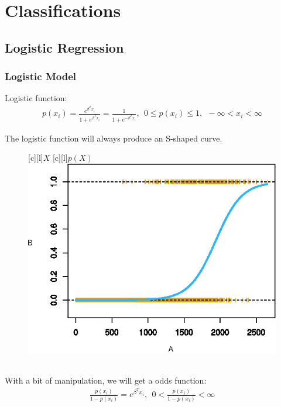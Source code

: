\documentclass[12pt,a4paper]{article}%
\theoremstyle{definition}
\theoremstyle{plain}
\numberwithin{equation}{section}
\begin{document}
\setcounter{section}{3}
\section{Classifications}
\subsection{\textbf{Logistic Regression}}
\subsubsection{\textbf{Logistic Model}}

Logistic function:
\begin{gather}
p(x_{i}) = \frac{e^{\beta^{T}x_{i}}}{1+e^{\beta^{T}x_{i}}} = \frac{1}{1+e^{-\beta^{T}x_{i}}},~~ 0 \leq p(x_{i}) \leq 1, ~~ -\infty < x_{i} < \infty
\label{logistic-model}
\end{gather}

The logistic function will always produce an S-shaped curve.
\begin{figure}[H]
\centering
{}[c][l]{$X$}
[c][l]{$p(X)$}
\includegraphics[scale=1]{images//4_2.eps}
\\~\\
\caption{}\label{figure-4.2}
\end{figure}

With a bit of manipulation, we will get a odds function:
\begin{gather}
\frac{p(x_{i})}{1-p(x_{i})} = e^{\beta^{T}x_{i}},~~ 0< \frac{p(x_{i})}{1-p(x_{i})} < \infty
\label{odds-function}
\end{gather}
\end{document}
